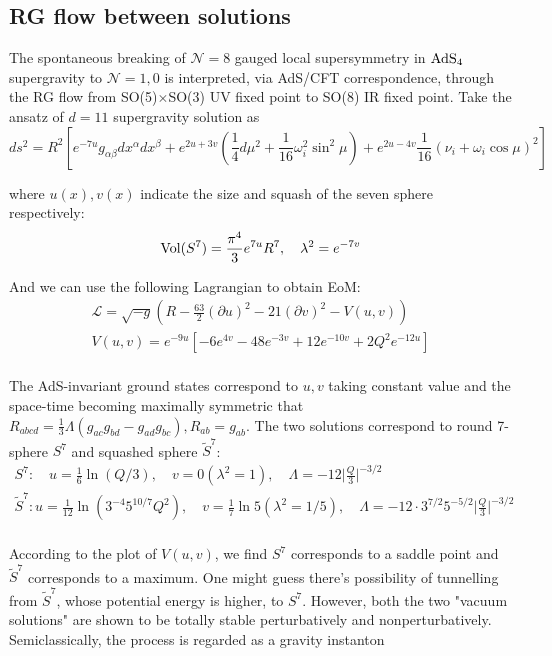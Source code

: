 \documentclass[12pt, a4paper]{article}
\numberwithin{equation}{section}
\newcommand{\be}{\begin{equation}}
\newcommand{\ee}{\end{equation}}
\newcommand{\cL}{\mathcal{L}}
\newcommand{\cN}{\mathcal{N}}
\begin{document}
\subsection{RG flow between solutions}
	The spontaneous breaking of $\cN = 8$ gauged local supersymmetry in ${\rm AdS_4}$ supergravity to $\cN = 1,0$ is interpreted, via AdS/CFT correspondence, through the RG flow from SO(5)$\times$SO(3) UV fixed point to SO(8) IR fixed point.\cite{Ahn:1999mh} Take the ansatz of $d = 11$ supergravity solution as
\be
	ds^2 = R^2\left[e^{-7u}g_{\alpha\beta}dx^\alpha dx^\beta +e^{2u+3v}\left(\frac{1}{4}d\mu^2+\frac{1}{16}\omega_i^2\sin^2\mu\right) + e^{2u-4v}\frac{1}{16}(\nu_i+\omega_i \cos\mu)^2\right]
\ee
	
	where $u(x), v(x)$ indicate the size and squash of the seven sphere respectively:
\be
	{\rm Vol}(S^7) = \frac{\pi^4}{3}e^{7u}R^7,\quad \lambda^2 = e^{-7v}
\ee
	
	And we can use the following Lagrangian to obtain EoM:
\be
\begin{aligned}
	\cL = \sqrt{-g}\left(R - \frac{63}{2}(\partial u)^2 -21(\partial v)^2 - V(u,v)\right)\\
	V(u,v) = e^{-9u}\left[-6e^{4v}-48e^{-3v}+12e^{-10v}+2Q^2e^{-12u}\right]\\
\end{aligned}
\ee
	
	The AdS-invariant ground states correspond to $u,v$ taking constant value and the space-time becoming maximally symmetric that $R_{abcd} = \frac{1}{3}\Lambda (g_{ac}g_{bd} - g_{ad}g_{bc}), R_{ab} = g_{ab}$. The two solutions correspond to round 7-sphere $S^7$ and squashed sphere $\tilde{S}^7$:
\be
\begin{aligned}
	S^7:\quad u = \frac{1}{6}\ln(Q/3),\quad v = 0(\lambda^2 = 1), \quad \Lambda = -12\Big|\frac{Q}{3}\Big|^{-3/2}\\
	\tilde{S}^7: u = \frac{1}{12}\ln(3^{-4}5^{10/7}Q^2),\quad v = \frac{1}{7}\ln5(\lambda^2 = 1/5),\quad \Lambda = -12\cdot 3^{7/2}5^{-5/2}\Big|\frac{Q}{3}\Big|^{-3/2}\\
\end{aligned}
\ee

	According to the plot of $V(u,v)$, we find $S^7$ corresponds to a saddle point and $\tilde{S}^7$ corresponds to a maximum. One might guess there's possibility of tunnelling from $\tilde{S}^7$, whose potential energy is higher, to $S^7$. However, both the two "vacuum solutions" are shown to be totally stable perturbatively and nonperturbatively. Semiclassically, the process is regarded as a gravity instanton {\color{red}{with infinite action, which prevents the vacuum decay.}}
\end{document}
